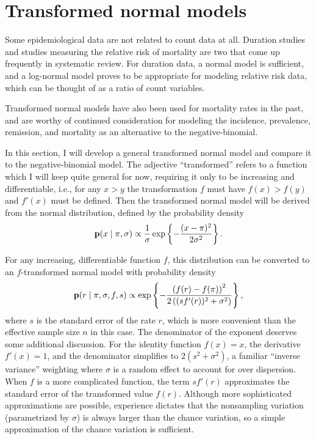\section{Transformed normal models}
\label{transformed-normal-models}
Some epidemiological data are not related to count data at all.
Duration studies and studies measuring the relative risk of mortality
are two that come up frequently in systematic review.  For duration
data, a normal model is sufficient, and a log-normal model proves to
be appropriate for modeling relative risk data, which can be thought
of as a ratio of count variables.

Transformed normal models have also been used for mortality rates in
the
past,\cite{girosi_demographic_2008,hogan_maternal_????,rajaratnam_neonatal_????}
and are worthy of continued consideration for modeling the incidence,
prevalence, remission, and mortality as an alternative to the
negative-binomial.

In this section, I will develop a general transformed normal model
and compare it to the negative-binomial model.  The adjective
``transformed'' refers to a function which I will keep quite general
for now, requiring it only to be increasing and differentiable,
i.e., for any $x > y$ the transformation $f$ must have $f(x) > f(y)$
and $f'(x)$ must be defined.  Then the transformed normal model will
be derived from the normal distribution, defined by the probability
density
\[
\mathbf{p}(x\;|\; \pi, \sigma)
 \propto \frac{1}{\sigma}
\exp\left\{ -\frac{(x-\pi)^2}{2\sigma^2} \right\}.
\]

For any increasing, differentiable function $f$, this distribution can
be converted to an $f$-transformed normal model with probability
density
\[
\mathbf{p}(r \;|\; \pi, \sigma, f, s) \propto
\exp\left\{-\frac{\left(f(r)-f(\pi)\right)^2}{2\left((sf'(r))^2+\sigma^2\right)}\right\},
\]
where $s$ is the standard error of the rate $r$, which is more
convenient than the effective sample size $n$ in this case. The
denominator of the exponent deserves some additional discussion.  For
the identity function $f(x) = x$, the derivative $f'(x) = 1$, and the
denominator simplifies to $2(s^2 + \sigma^2)$, a familiar ``inverse
variance'' weighting where $\sigma$ is a random effect to account for
over dispersion.  When $f$ is a more complicated function, the term
$sf'(r)$ approximates the standard error of the transformed value
$f(r)$.  Although more sophisticated approximations are possible,
experience dictates that the nonsampling variation (parametrized by
$\sigma$) is always larger than the chance variation, so a simple
approximation of the chance variation is sufficient.

